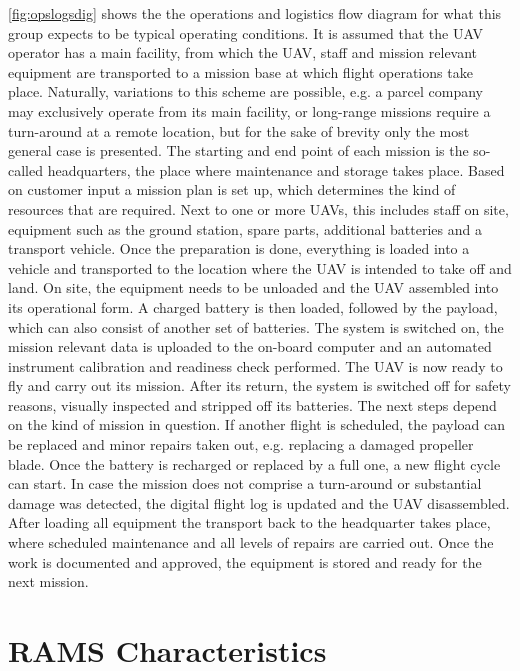 \autoref{fig:opslogsdig} shows the the operations and logistics flow diagram for what this group expects to be typical operating conditions. It is assumed that the UAV operator has a main facility, from which the UAV, staff and mission relevant equipment are transported to a mission base at which flight operations take place. Naturally, variations to this scheme are possible, e.g. a parcel company may exclusively operate from its main facility, or long-range missions require a turn-around at a remote location, but for the sake of brevity only the most general case is presented.
The starting and end point of each mission is the so-called headquarters, the place where maintenance and storage takes place. Based on customer input a mission plan is set up, which determines the kind of resources that are required. Next to one or more UAVs, this includes staff on site, equipment such as the ground station, spare parts, additional batteries and a transport vehicle. Once the preparation is done, everything is loaded into a vehicle and transported to the location where the UAV is intended to take off and land. On site, the equipment needs to be unloaded and the UAV assembled into its operational form. A charged battery is then loaded, followed by the payload, which can also consist of another set of batteries. The system is switched on, the mission relevant data is uploaded to the on-board computer and an automated instrument calibration and readiness check performed. The UAV is now ready to fly and carry out its mission. After its return, the system is switched off for safety reasons, visually inspected and stripped off its batteries. The next steps depend on the kind of mission in question. If another flight is scheduled, the payload can be replaced and minor repairs taken out, e.g. replacing a damaged propeller blade. Once the battery is recharged or replaced by a full one, a new flight cycle can start. In case the mission does not comprise a turn-around or substantial damage was detected, the digital flight log is updated and the UAV disassembled. After loading all equipment the transport back to the headquarter takes place, where scheduled maintenance and all levels of repairs are carried out. Once the work is documented and approved, the equipment is stored and ready for the next mission.

\section{RAMS Characteristics}
\label{sec:rams_char}

